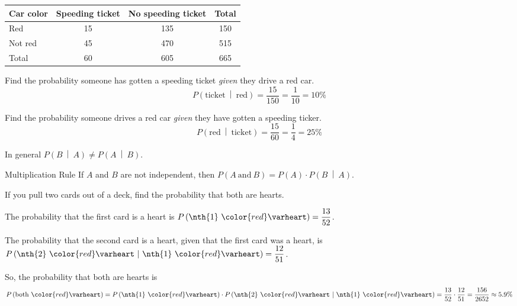 \documentclass{beamer}
\newcommand{\suitheart}[1][]{{\color{red}\text{#1}\varheart}}
\newcommand{\prob}[1]{P\left(#1\right)}
\newcommand{\condprob}[2]{\prob{#1~\middle|~#2}}
\begin{document}
\begin{frame}
\begin{example}
\begin{center}
\begin{tabular}{|l|c|c|c|}
\hline
Car color & Speeding ticket & No speeding ticket & Total \\ \hline
Red & 15 & 135 & 150 \\ \hline
Not red & 45 & 470 & 515 \\ \hline
Total & 60 & 605 & 665 \\ \hline
\end{tabular}
\end{center}

Find the probability someone has gotten a speeding ticket \emph{given} they drive a red car.\pause
\begin{equation*}
\condprob{\text{ticket}}{\text{red}} = \dfrac{15}{150} = \dfrac{1}{10} = 10\%
\end{equation*}\pause

Find the probability someone drives a red car \emph{given} they have gotten a speeding ticker.\pause
\begin{equation*}
\condprob{\text{red}}{\text{ticket}} = \dfrac{15}{60} = \dfrac{1}{4} = 25\%
\end{equation*}
\end{example}\pause

\begin{note}
In general $\condprob{B}{A}\neq\condprob{A}{B}$.
\end{note}
\end{frame}

\begin{frame}
\begin{block}{Multiplication Rule}
If $A$ and $B$ are not independent, then $\prob{A~\text{and}~B}=\prob{A}\cdot\condprob{B}{A}$.
\end{block}\pause

\begin{example}
If you pull two cards out of a deck, find the probability that both are hearts.\pause

\vspace{2mm}
The probability that the first card is a heart is $\prob{\text{\nth{1} $\suitheart$}}=\dfrac{13}{52}$.\pause

\vspace{2mm}
The probability that the second card is a heart, given that the first card was a heart, is $\condprob{\text{\nth{2} $\suitheart$}}{\text{\nth{1} $\suitheart$}}=\dfrac{12}{51}$.\pause

\vspace{2mm}
So, the probability that both are hearts is
\begin{equation*}
\prob{\text{both $\suitheart$}}=\prob{\text{\nth{1} $\suitheart$}}\cdot\condprob{\text{\nth{2} $\suitheart$}}{\text{\nth{1} $\suitheart$}} =  \dfrac{13}{52} \cdot \dfrac{12}{51} = \dfrac{156}{2652} \approx 5.9\%
\end{equation*}
\end{example}
\end{frame}
\end{document}

